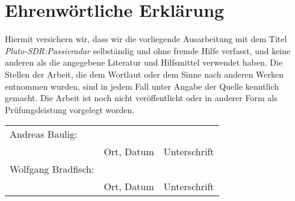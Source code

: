 \chapter*{Ehrenwörtliche Erklärung}

Hiermit versichern wir, dass wir die vorliegende Ausarbeitung mit dem Titel \emph{Pluto-SDR:\@ Passivradar} selbständig und ohne fremde Hilfe verfasst, und keine anderen als die angegebene Literatur und Hilfsmittel verwendet haben. Die Stellen der Arbeit, die dem Wortlaut oder dem Sinne nach anderen Werken entnommen wurden, sind in jedem Fall unter Angabe der Quelle kenntlich gemacht. Die Arbeit ist noch nicht veröffentlicht oder in anderer Form als Prüfungsleistung vorgelegt worden.

\vspace{4cm}

\begin{tabularx}{\textwidth}{ l X X}
    Andreas Baulig:     & \hrulefill{} & \hrulefill{} \\
    \vspace{1.5cm}      & Ort, Datum   & Unterschrift \\
    Wolfgang Bradfisch: & \hrulefill{} & \hrulefill{} \\
    \vspace{1.5cm}      & Ort, Datum   & Unterschrift \\
\end{tabularx}
